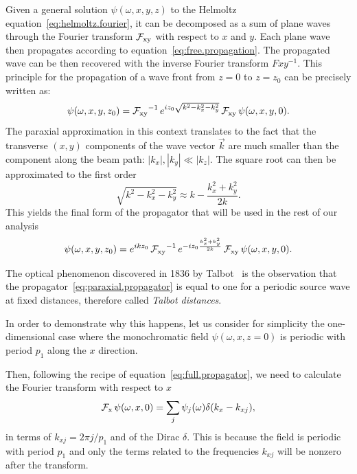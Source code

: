 Given a general solution $\psi(\omega, x, y, z)$ to the Helmoltz
equation~\eqref{eq:helmoltz.fourier}, it can be decomposed as a sum of plane
waves through the Fourier transform $\operatorname{\mathcal{F}_{xy}}$ with respect to $x$ and $y$. Each
plane wave then propagates according to
equation~\eqref{eq:free.propagation}. The propagated wave can be then
recovered with the inverse Fourier transform $Fxy^{-1}$.
This principle for the propagation of a wave front from $z=0$ to $z=z_0$ can
be precisely written as:
\begin{equation}
    \psi(\omega, x, y, z_0) = \operatorname{\mathcal{F}_{xy}}^{-1}e^{i z_0 \sqrt{k^2 - k_x^2 -
    k_y^2}}\operatorname{\mathcal{F}_{xy}}    \psi(\omega, x, y, 0).
    \label{eq:full.propagator}
\end{equation}
The paraxial approximation in this context translates to the fact that the
transverse $(x, y)$ components of the wave vector $\vec{k}$ are much smaller than the
component along the beam path: $|k_x|, |k_y| \ll |k_z|$. The square root can
then be approximated to the first order
\begin{equation}
    \sqrt{k^2 - k_x^2 - k_y^2} \approx k - \frac{k_x^2 + k_y^2}{2k}.
    \label{eq:square.root.approximation}
\end{equation}
This yields the final form of the propagator that will be used in the rest
of our analysis
\begin{equation}
    \psi(\omega, x, y, z_0) = e^{i k z_0}\operatorname{\mathcal{F}_{xy}}^{-1}e^{-i z_0\frac{k_x^2 +
    k_y^2}{2k}}\operatorname{\mathcal{F}_{xy}}\psi(\omega, x, y, 0). \label{eq:paraxial.propagator}
\end{equation}

The optical phenomenon discovered in 1836 by Talbot~\cite{Talbot1836} is the observation that
the propagator~\eqref{eq:paraxial.propagator} is equal to one for a periodic
source wave at fixed distances, therefore called \emph{Talbot distances}.

In order to demonstrate why this happens, let us consider for simplicity the one-dimensional case where the
monochromatic field $\psi(\omega, x, z=0)$ is periodic with period $p_1$
along the $x$ direction. 

Then, following the recipe of equation~\eqref{eq:full.propagator}, we need
to calculate the Fourier transform with respect to $x$
\begin{equation*}
    \operatorname{\mathcal{F}_{x}}\psi(\omega, x, 0) = \sum_j \psi_j(\omega)\delta(k_x -
    k_{xj}),
\end{equation*}
in terms of $k_{xj} = 2\pi j/ p_1$ and of the Dirac $\delta$. This is
because the field is periodic with period $p_1$ and only the terms related
to the frequencies $k_{xj}$ will be nonzero after the transform.

